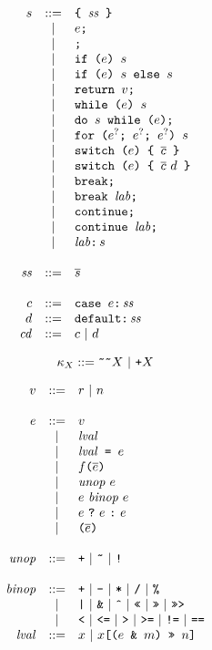 \documentclass{article}
\newcommand{\ternary}[3]{{#1}\ \mathjs{?}\ {#2}\ \mathjs{:}\ {#3}}
\newcommand{\funcall}[2]{{#1}\mathjs{(}{#2}\mathjs{)}}
\newcommand{\paren}[1]{\mathjs{(}{#1}\mathjs{)}}
\newcommand{\seq}[1]{\overline{{#1}}}
\newcommand{\mathjs}[1]{\mbox{\texttt{{#1}}}}
\newcommand{\return}[1]{\mathjs{return }{#1}\mathjs{;}}
\newcommand{\while}[2]{\mathjs{while (}{#1}\mathjs{) }{#2}}
\newcommand{\dowhile}[2]{\mathjs{do }{#1}\mathjs{ while (}{#2}\mathjs{);}}
\newcommand{\for}[4]{\mathjs{for (}{#1}\mathjs{; }{#2}\mathjs{; }{#3}\mathjs{) }{#4}}
\newcommand{\switch}[2]{\mathjs{switch (}{#1}\mathjs{) \{ }{#2}\mathjs{ \}}}
\newcommand{\brk}{\mathjs{break;}}
\newcommand{\brkl}[1]{\mathjs{break }{#1}\mathjs{;}}
\newcommand{\cont}{\mathjs{continue;}}
\newcommand{\contl}[1]{\mathjs{continue }{#1}\mathjs{;}}
\newcommand{\lab}[2]{{#1}\mathjs{:}\,{#2}}
\newcommand{\ifthen}[2]{\mathjs{if (}{#1}\mathjs{) }{#2}}
\newcommand{\ifthenelse}[3]{\mathjs{if (}{#1}\mathjs{) }{#2}\mathjs{ else }{#3}}
\newcommand{\block}[1]{\mathjs{\{ }{#1}\mathjs{ \}}}
\newcommand{\getprop}[2]{{#1}\mathjs{[}{#2}\mathjs{]}}
\newcommand{\tobits}[1]{\mathjs{\~{}\~{}}{#1}}
\newcommand{\tofloat}[1]{\mathjs{+}{#1}}
\begin{document}
\[
\begin{array}{rcl}
s & ::= & \block{\mathit{ss}} \\
  &  |  & e\mathjs{;} \\
  &  |  & \mathjs{;} \\
  &  |  & \ifthen{e}{s} \\
  &  |  & \ifthenelse{e}{s}{s} \\
  &  |  & \return{v} \\
  &  |  & \while{e}{s} \\
  &  |  & \dowhile{s}{e} \\
  &  |  & \for{e^?}{e^?}{e^?}{s} \\
  &  |  & \switch{e}{\seq{c}} \\
  &  |  & \switch{e}{\seq{c}\ d} \\
  &  |  & \brk \\
  &  |  & \brkl{\mathit{lab}} \\
  &  |  & \cont \\
  &  |  & \contl{\mathit{lab}} \\
  &  |  & \lab{\mathit{lab}}{s} \\
\\
\mathit{ss} & ::= & \seq{s} \\
\\
c & ::= & \mathjs{case }e\mathjs{:}\,\mathit{ss} \\
d & ::= & \mathjs{default:}\,\mathit{ss} \\
\mathit{cd} & ::= & c ~|~ d \\
\end{array}
\]

\[
\kappa_X ::= \tobits{X} ~|~ \tofloat{X}
\]

\[
\begin{array}{rcl}
v & ::= & r ~|~ n \\
\\
e & ::= & v \\
  &  |  & \mathit{lval} \\
  &  |  & \mathit{lval}\mathjs{ = }e \\
  &  |  & \funcall{f}{\seq{e}} \\
  &  |  & \mathit{unop}\ e \\
  &  |  & e\ \mathit{binop}\ e \\
  &  |  & \ternary{e}{e}{e} \\
  &  |  & \paren{\seq{e}} \\
\\
\mathit{unop} & ::= & \mathjs{+} ~|~ \mathjs{\~{}} ~|~ \mathjs{!} \\
\\
\mathit{binop} & ::= & \mathjs{+} ~|~ \mathjs{-} ~|~ \mathjs{*} ~|~ \mathjs{/} ~|~ \mathjs{\%} \\
               &  |  & \mathjs{|} ~|~ \mathjs{\&} ~|~ \mathjs{\^{}} ~|~ \mathjs{<<} ~|~ \mathjs{>>} ~|~ \mathjs{>>>} \\
               &  |  & \mathjs{<} ~|~ \mathjs{<=} ~|~ \mathjs{>} ~|~ \mathjs{>=} ~|~ \mathjs{!=} ~|~ \mathjs{==} \\
\mathit{lval} & ::= & x ~|~ \getprop{x}{\paren{e\mathjs{ \& }m}\mathjs{ >> }n} \\
\end{array}
\]
\end{document}
